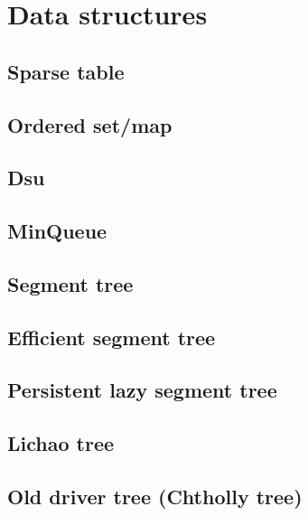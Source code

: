 \section{Data structures}

\subsection{Sparse table}

\subsection{Ordered set/map}

\subsection{Dsu}

\subsection{MinQueue}

\subsection{Segment tree}

\subsection{Efficient segment tree}

\subsection{Persistent lazy segment tree}

\subsection{Lichao tree}

\subsection{Old driver tree (Chtholly tree)}

